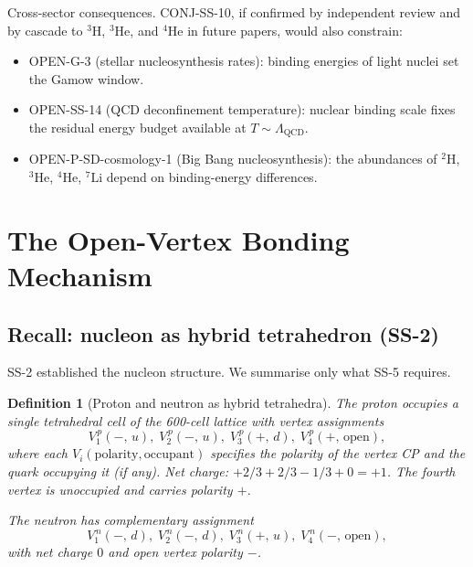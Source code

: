 \documentclass[11pt,letterpaper]{article}
\newtheorem{definition}[theorem]{Definition}
\newcommand{\LQCD}{\Lambda_{\mathrm{QCD}}}
\begin{document}
Cross-sector consequences. CONJ-SS-10, if confirmed by independent review and by cascade to ${}^{3}\mathrm{H}$, ${}^{3}\mathrm{He}$, and ${}^{4}\mathrm{He}$ in future papers, would also constrain:
\begin{itemize}
\item OPEN-G-3 (stellar nucleosynthesis rates): binding energies of light nuclei set the Gamow window.
\item OPEN-SS-14 (QCD deconfinement temperature): nuclear binding scale fixes the residual energy budget available at $T \sim \LQCD$.
\item OPEN-P-SD-cosmology-1 (Big Bang nucleosynthesis): the abundances of ${}^{2}\mathrm{H}$, ${}^{3}\mathrm{He}$, ${}^{4}\mathrm{He}$, ${}^{7}\mathrm{Li}$ depend on binding-energy differences.
\end{itemize}

\section{The Open-Vertex Bonding Mechanism}
\label{sec:mechanism}

\subsection{Recall: nucleon as hybrid tetrahedron (SS-2)}

SS-2 established the nucleon structure. We summarise only what SS-5 requires.

\begin{definition}[Proton and neutron as hybrid tetrahedra]
\label{def:nucleons}
The proton occupies a single tetrahedral cell of the 600-cell lattice with vertex assignments
\begin{equation*}
V_1^{\,p}(-,\, u),\; V_2^{\,p}(-,\, u),\; V_3^{\,p}(+,\, d),\; V_4^{\,p}(+,\, \mathrm{open}),
\end{equation*}
where each $V_i(\text{polarity},\text{occupant})$ specifies the polarity of the vertex CP and the quark occupying it (if any). Net charge: $+2/3 + 2/3 - 1/3 + 0 = +1$. The fourth vertex is unoccupied and carries polarity $+$.

The neutron has complementary assignment
\begin{equation*}
V_1^{\,n}(-,\, d),\; V_2^{\,n}(-,\, d),\; V_3^{\,n}(+,\, u),\; V_4^{\,n}(-,\, \mathrm{open}),
\end{equation*}
with net charge $0$ and open vertex polarity $-$.
\end{definition}
\end{document}
